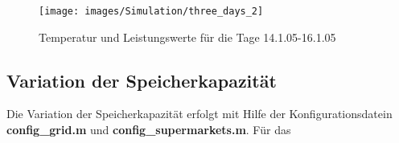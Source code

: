 \begin{figure}[h]
\begin{center}
\texttt{[image: images/Simulation/three\_days\_2]}
\end{center}
\vspace{-25pt}
\caption{Temperatur und Leistungswerte f\"ur die Tage 14.1.05-16.1.05}
\label{fig:threet}
\end{figure}

\subsection*{Variation der Speicherkapazit\"at}

Die Variation der Speicherkapazit\"at erfolgt mit Hilfe der Konfigurationsdatein
\textbf{config\_grid.m} und \textbf{config\_supermarkets.m}. F\"ur das 


